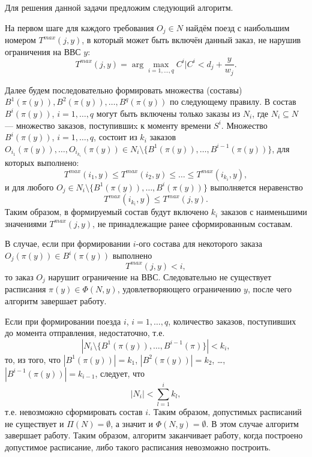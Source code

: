 Для решения данной задачи предложим следующий алгоритм.

На первом шаге для каждого требования $O_j \in N$ найдём поезд с наибольшим номером $T^{max}(j, y)$, в который может быть включён данный заказ, не нарушив ограничения на ВВС $y$:
$$T^{max}(j, y) = \arg \max\limits_{i = 1, \dots, q} C^i | C^i < d_j + \frac{y}{w_j}.$$

Далее будем последовательно формировать множества (составы) $B^1(\pi(y)), B^2(\pi(y)), \dots, B^q(\pi(y))$ по следующему правилу. В состав $B^i(\pi(y))$, $i=1, \dots, q$ могут быть включены только заказы из $N_i$, где $N_i \subseteq N$ --- множество заказов, поступившиx к моменту времени $S^i$. Множество $B^i(\pi(y))$, $i=1, \dots, q$, состоит из $k_i$ заказов $O_{i_1}(\pi(y)), \dots, O_{i_{k_i}}(\pi(y)) \in N_i \setminus\{B^1(\pi(y)), \dots, B^{i-1}(\pi(y))\}$, для которых выполнено:
$$T^{max}(i_1,y) \leq T^{max}(i_2,y) \leq \dots \leq T^{max}(i_{k_i},y),$$
и для любого $O_j \in N_i\setminus\{B^1(\pi(y)), \dots, B^{i}(\pi(y))\}$ выполняется неравенство
$$T^{max}(i_{k_i},y) \leq T^{max}(j,y).$$
Таким образом, в формируемый состав будут включено $k_i$ заказов с наименьшими значениями $T^{max}(j,y)$, не принадлежащие ранее сформированным составам.

В случае, если при формировании $i$-ого состава для некоторого заказа $O_{j}(\pi(y)) \in B^i(\pi(y))$ выполнено
$$T^{max}(j,y) < i,$$
то заказ $O_j$ нарушит ограничение на ВВС. Следовательно не существует расписания $\pi(y) \in \Phi(N, y)$, удовлетворяющего ограничению $y$, после чего алгоритм завершает работу.

Если при формировании поезда $i$, $i=1, \dots, q$, количество заказов, поступивших до момента отправления, недостаточно, т.е.
$$|N_i \setminus \{B^1(\pi(y)), \dots, B^{i-1}(\pi)\}| < k_i,$$
то, из того, что $|B^1(\pi(y))| = k_1$, $|B^2(\pi(y))| = k_2$, \dots, $|B^{i-1}(\pi(y))| = k_{i-1}$, следует, что
$$|N_i| < \sum\limits_{l=1}^{i} k_l,$$
т.е. невозможно сформировать состав $i$.
Таким образом, допустимых расписаний не существует и $\Pi(N) = \emptyset$, а значит и $\Phi(N, y) = \emptyset$. В этом случае алгоритм завершает работу. Таким образом, алгоритм заканчивает работу, когда построено допустимое расписание, либо такого расписания невозможно построить.

